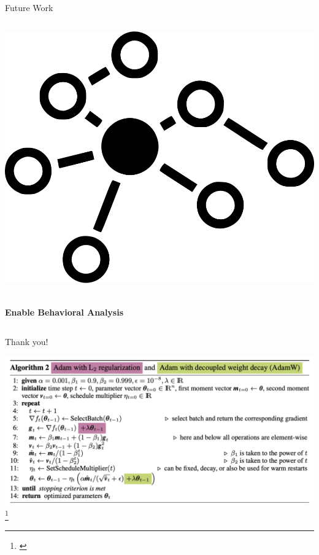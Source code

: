 \documentclass[serif]{beamer}  %
\begin{document}
\begin{frame}{Future Work}
\begin{columns}[T,totalwidth=\textwidth]
        \begin{column}{0.32\textwidth}
            \centering
            \vspace{1em}
            \includegraphics[width=0.6\linewidth]{images/graph_icon.png}
            \vspace{1em}
            \parbox{\linewidth}{\centering\textbf{\\Enable Behavioral Analysis}}
        \end{column}
        
    \end{columns}
    
\end{frame}

\begin{frame}
\centering
{\Huge Thank you!}
\end{frame}

\begin{frame}
    \centering
    \includegraphics[width=\textwidth]{images/adamw_algo.png}
    \footnote{\cite{loshchilov2019decoupledweightdecayregularization}}
\end{frame}
    
\end{document}
